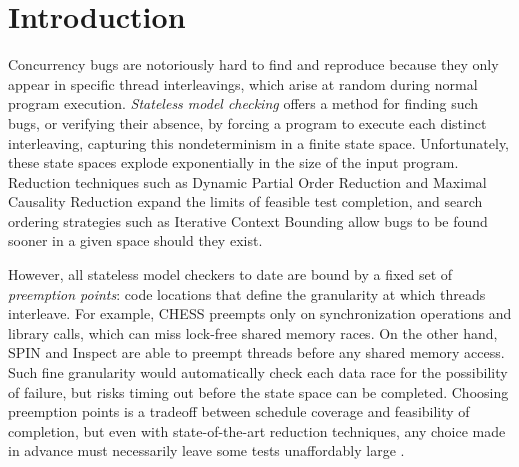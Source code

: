 \section{Introduction}

Concurrency bugs are notoriously hard to find and reproduce because they only appear in specific thread interleavings, which arise at random during normal program execution.
{\em Stateless model checking} \cite{verisoft} offers a method for finding such bugs,
or verifying their absence,
by forcing a program to execute each distinct interleaving,
capturing
this nondeterminism in a finite state space.
Unfortunately, these state spaces explode exponentially in the size of the input program.
Reduction techniques such as Dynamic Partial Order Reduction \cite{dpor} and Maximal Causality Reduction \cite{mcr} expand the limits of feasible test completion,
and search ordering strategies such as Iterative Context Bounding \cite{chess-icb} allow bugs to be found sooner in a given space should they exist.

However, all stateless model checkers to date are bound by a fixed set of {\em preemption points}: code locations that define the granularity at which threads interleave.
For example, \textsc{CHESS} \cite{chess} preempts only on synchronization operations and library calls, which can miss lock-free shared memory races.
%
On the other hand, SPIN \cite{spin} and Inspect \cite{inspect}
are able to preempt threads before any shared memory access. Such fine granularity would automatically check each data race for the possibility of failure, but risks timing out before the state space can be completed. %
Choosing preemption points is a tradeoff between schedule coverage and feasibility of completion,
but even with state-of-the-art reduction techniques,
any choice made in advance must necessarily leave some tests unaffordably large \cite{parrot,mcr}.
%


